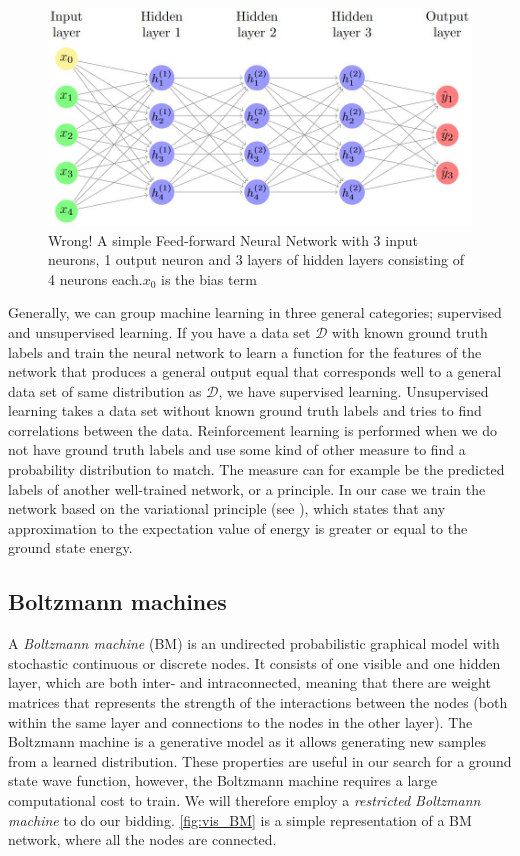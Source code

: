 \begin{figure}[htbp]
  \centering
  \includegraphics[scale=0.5]{Images/DFFNN.JPG}
  \caption{Wrong! A simple Feed-forward Neural Network with 3 input neurons, 1 output neuron and 3 layers of hidden layers consisting of 4 neurons each.$x_0$ is the bias term}
  \label{fig:NN}
\end{figure}

Generally, we can group machine learning in three general categories; supervised and unsupervised learning. If you have a data set $\mathcal{D}$ with known ground truth labels and train the neural network to learn a function for the features of the network that produces a general output equal that corresponds well to a general data set of same distribution as $\mathcal{D}$, we have supervised learning. Unsupervised learning takes a data set without known ground truth labels and tries to find correlations between the data. Reinforcement learning is performed when we do not have ground truth labels and use some kind of other measure to find a probability distribution to match. The measure can for example be the predicted labels of another well-trained network, or a principle. In our case we train the network based on the variational principle (see \citep{project1}), which states that any approximation to the expectation value of energy is greater or equal to the ground state energy. 

\subsection{Boltzmann machines}
A \textit{Boltzmann machine} (BM) is an undirected probabilistic graphical model with stochastic continuous or discrete nodes. It consists of one visible and one hidden layer, which are both inter- and intraconnected, meaning that there are weight matrices that represents the strength of the interactions between the nodes (both within the same layer and connections to the nodes in the other layer). The Boltzmann machine is a generative model as it allows generating new samples from a learned distribution. These properties are useful in our search for a ground state wave function, however, the Boltzmann machine requires a large computational cost to train. We will therefore employ a \textit{restricted Boltzmann machine} to do our bidding.  \autoref{fig:vis_BM} is a simple representation of a BM network, where all the nodes are connected. 


